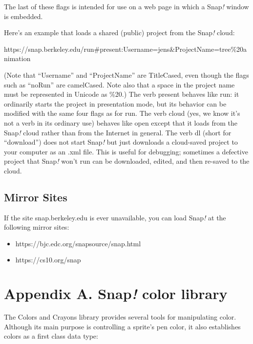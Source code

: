 The last of these flags is intended for use on a web page in which a
Snap\emph{!} window is embedded.

Here's an example that loads a shared (public) project from the
Snap\emph{!} cloud:

https://snap.berkeley.edu/run\#present:Username=jens\&ProjectName=tree\%20animation

(Note that ``Username'' and ``ProjectName'' are TitleCased, even though
the flags such as ``noRun'' are camelCased. Note also that a space in
the project name must be represented in Unicode as \%20.) The verb
present behaves like run: it ordinarily starts the project in
presentation mode, but its behavior can be modified with the same four
flags as for run. The verb cloud (yes, we know it's not a verb in its
ordinary use) behaves like open except that it loads from the
Snap\emph{!} cloud rather than from the Internet in general. The verb dl
(short for ``download'') does not start Snap\emph{!} but just downloads
a cloud-saved project to your computer as an .xml file. This is useful
for debugging; sometimes a defective project that Snap\emph{!} won't run
can be downloaded, edited, and then re-saved to the cloud.

\subsection{Mirror Sites}\label{mirror-sites}

If the site snap.berkeley.edu is ever unavailable, you can load
Snap\emph{!} at the following mirror sites:

\begin{itemize}
\item
  https://bjc.edc.org/snapsource/snap.html
\item
  https://cs10.org/snap
\end{itemize}

\section*{\texorpdfstring{\hfill\break
Appendix A. Snap\emph{!} color
library}{ Appendix A. Snap! color library}}\label{appendix-a.-snap-color-library}

The Colors and Crayons library provides several tools for manipulating
color. Although its main purpose is controlling a sprite's pen color, it
also establishes colors as a first class data type:


